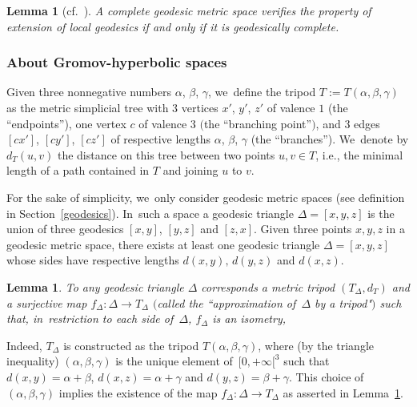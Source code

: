 \documentclass[10pt,a4paper]{amsart}
\numberwithin{equation}{section}
\newtheorem{Lemma}[theor]{Lemma}
\newcommand{\f}{\rightarrow}
\begin{document}
\begin{Lemma}[{cf.~\cite[Lemma~II.5.8(1), p.~208]{BH}}]%
A \emph{complete} geodesic metric space verifies the property of extension of local geodesics if and only if it is geodesically complete.
\end{Lemma}

\subsubsection{About Gromov-hyperbolic spaces}%

Given three nonnegative numbers $\alpha$, $\beta$, $\gamma$, we~define
the tripod $T := T(\alpha, \beta, \gamma)$ as the metric simplicial tree
with $3$ vertices
$x'$, $y'$, $z'$ of valence $1$ (the ``endpoints''), one vertex $c$
of valence $3$ $($the ``branching point''$)$, and $3$ edges $[cx']$,
$[cy']$, $[cz']$
of respective lengths $\alpha$, $\beta$, $\gamma$ (the ``branches''). We~denote by $d_T (u,v) $ the distance on this tree between two points $u,v \in
T$, i.e., the minimal length of a path contained in $T$ and joining $u$ to
$v$.

\medskip

For the sake of simplicity, we~only consider geodesic metric spaces (see definition in Section~\ref{geodesics}). In~such a space a geodesic triangle
$\Delta = [x, y, z]$ is the union of three geodesics $[x, y ]$, $[y, z ]$ and $[z, x ]$. Given three points $x,y,z$ in a geodesic metric space, there
exists at least one geodesic triangle $\Delta = [x, y, z]$ whose sides have respective lengths $d(x,y),\, d(y,z)$ and $d(x,z)$.

\begin{Lemma}\label{prodist}
To any geodesic triangle $\Delta$ corresponds a metric tripod $(T_\Delta, d_T)$ and a surjective map $f_\Delta \colon \Delta \f T_\Delta$ $($called the
``approximation of~$\Delta$ by a tripod"$)$ such that, in~restriction
to each side of~$\Delta$, $f_\Delta$ is an isometry,
\end{Lemma}

Indeed, $T_\Delta$ is constructed as the tripod $ T(\alpha, \beta, \gamma)$, where (by the triangle inequality) $(\alpha, \beta, \gamma)$ is the
unique element of~$[0, +\infty[^3$ such that $d(x, y) = \alpha + \beta$, $d(x, z) = \alpha + \gamma$ and $d(y, z) = \beta + \gamma$. This choice of~$(\alpha, \beta, \gamma)$ implies the existence of the map $f_\Delta \colon \Delta \f T_\Delta$ as asserted in Lemma~\ref{prodist}.
\end{document}
